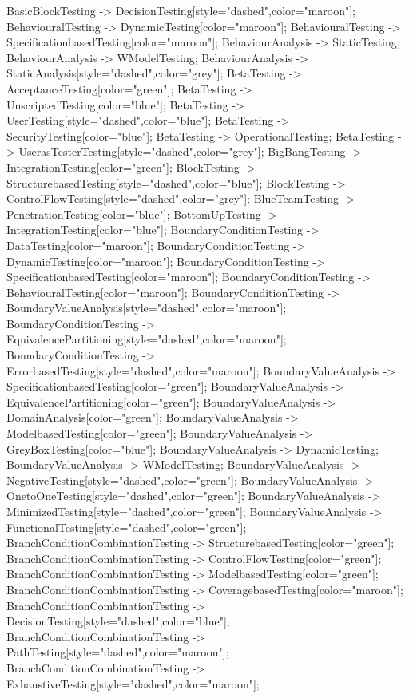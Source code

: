 \documentclass{article}
\begin{document}
{BasicBlockTesting -> DecisionTesting[style="dashed",color="maroon"];
BehaviouralTesting -> DynamicTesting[color="maroon"];
BehaviouralTesting -> SpecificationbasedTesting[color="maroon"];
BehaviourAnalysis -> StaticTesting;
BehaviourAnalysis -> WModelTesting;
BehaviourAnalysis -> StaticAnalysis[style="dashed",color="grey"];
BetaTesting -> AcceptanceTesting[color="green"];
BetaTesting -> UnscriptedTesting[color="blue"];
BetaTesting -> UserTesting[style="dashed",color="blue"];
BetaTesting -> SecurityTesting[color="blue"];
BetaTesting -> OperationalTesting;
BetaTesting -> UserasTesterTesting[style="dashed",color="grey"];
BigBangTesting -> IntegrationTesting[color="green"];
BlockTesting -> StructurebasedTesting[style="dashed",color="blue"];
BlockTesting -> ControlFlowTesting[style="dashed",color="grey"];
BlueTeamTesting -> PenetrationTesting[color="blue"];
BottomUpTesting -> IntegrationTesting[color="blue"];
BoundaryConditionTesting -> DataTesting[color="maroon"];
BoundaryConditionTesting -> DynamicTesting[color="maroon"];
BoundaryConditionTesting -> SpecificationbasedTesting[color="maroon"];
BoundaryConditionTesting -> BehaviouralTesting[color="maroon"];
BoundaryConditionTesting -> BoundaryValueAnalysis[style="dashed",color="maroon"];
BoundaryConditionTesting -> EquivalencePartitioning[style="dashed",color="maroon"];
BoundaryConditionTesting -> ErrorbasedTesting[style="dashed",color="maroon"];
BoundaryValueAnalysis -> SpecificationbasedTesting[color="green"];
BoundaryValueAnalysis -> EquivalencePartitioning[color="green"];
BoundaryValueAnalysis -> DomainAnalysis[color="green"];
BoundaryValueAnalysis -> ModelbasedTesting[color="green"];
BoundaryValueAnalysis -> GreyBoxTesting[color="blue"];
BoundaryValueAnalysis -> DynamicTesting;
BoundaryValueAnalysis -> WModelTesting;
BoundaryValueAnalysis -> NegativeTesting[style="dashed",color="green"];
BoundaryValueAnalysis -> OnetoOneTesting[style="dashed",color="green"];
BoundaryValueAnalysis -> MinimizedTesting[style="dashed",color="green"];
BoundaryValueAnalysis -> FunctionalTesting[style="dashed",color="green"];
BranchConditionCombinationTesting -> StructurebasedTesting[color="green"];
BranchConditionCombinationTesting -> ControlFlowTesting[color="green"];
BranchConditionCombinationTesting -> ModelbasedTesting[color="green"];
BranchConditionCombinationTesting -> CoveragebasedTesting[color="maroon"];
BranchConditionCombinationTesting -> DecisionTesting[style="dashed",color="blue"];
BranchConditionCombinationTesting -> PathTesting[style="dashed",color="maroon"];
BranchConditionCombinationTesting -> ExhaustiveTesting[style="dashed",color="maroon"];
}
\end{document}
